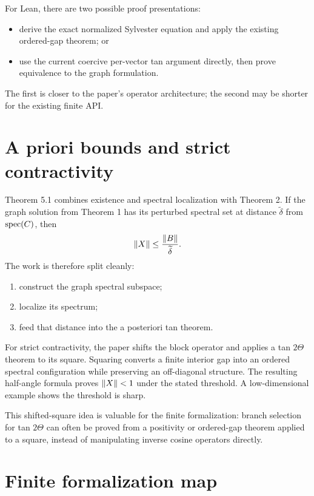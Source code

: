 For Lean, there are two possible proof presentations:
\begin{itemize}[leftmargin=2em]
\item derive the exact normalized Sylvester equation and apply the existing ordered-gap theorem; or
\item use the current coercive per-vector tan argument directly, then prove equivalence to the graph formulation.
\end{itemize}
The first is closer to the paper's operator architecture; the second may be shorter for the existing finite API.

\section{A priori bounds and strict contractivity}

Theorem 5.1 combines existence and spectral localization with Theorem 2. If the graph solution from Theorem 1 has its perturbed spectral set at distance $\widetilde\delta$ from $\operatorname{spec}(C)$, then
\[
 \left\lVert X\right\rVert\le\frac{\left\lVert B\right\rVert}{\widetilde\delta}.
\]
The work is therefore split cleanly:
\begin{enumerate}[leftmargin=2em]
\item construct the graph spectral subspace;
\item localize its spectrum;
\item feed that distance into the a posteriori tan theorem.
\end{enumerate}

For strict contractivity, the paper shifts the block operator and applies a tan $2\Theta$ theorem to its square. Squaring converts a finite interior gap into an ordered spectral configuration while preserving an off-diagonal structure. The resulting half-angle formula proves $\left\lVert X\right\rVert<1$ under the stated threshold. A low-dimensional example shows the threshold is sharp.

This shifted-square idea is valuable for the finite formalization: branch selection for tan $2\Theta$ can often be proved from a positivity or ordered-gap theorem applied to a square, instead of manipulating inverse cosine operators directly.

\section{Finite formalization map}


